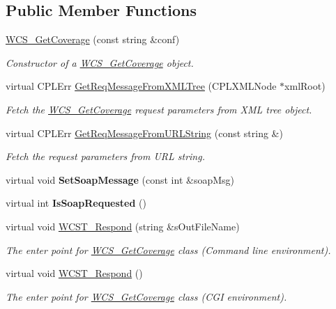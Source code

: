 \subsection*{Public Member Functions}
\begin{DoxyCompactItemize}
\item 
\hyperlink{classWCS__GetCoverage_a2bc572e0a90baf87f5d572d29db7e32e}{WCS\_\-GetCoverage} (const string \&conf)
\begin{DoxyCompactList}\small\item\em Constructor of a \hyperlink{classWCS__GetCoverage}{WCS\_\-GetCoverage} object. \end{DoxyCompactList}\item 
virtual CPLErr \hyperlink{classWCS__GetCoverage_a1a23003ebbaef4915fdc88863abf987c}{GetReqMessageFromXMLTree} (CPLXMLNode $\ast$xmlRoot)
\begin{DoxyCompactList}\small\item\em Fetch the \hyperlink{classWCS__GetCoverage}{WCS\_\-GetCoverage} request parameters from XML tree object. \end{DoxyCompactList}\item 
virtual CPLErr \hyperlink{classWCS__GetCoverage_aff25c578374abc386dc1455990198276}{GetReqMessageFromURLString} (const string \&)
\begin{DoxyCompactList}\small\item\em Fetch the request parameters from URL string. \end{DoxyCompactList}\item 
\hypertarget{classWCS__GetCoverage_aa5828099182998b05b50418161d01c8d}{
virtual void {\bfseries SetSoapMessage} (const int \&soapMsg)}
\label{classWCS__GetCoverage_aa5828099182998b05b50418161d01c8d}

\item 
\hypertarget{classWCS__GetCoverage_a2091115ee1479ddef8071f8fca80cf6b}{
virtual int {\bfseries IsSoapRequested} ()}
\label{classWCS__GetCoverage_a2091115ee1479ddef8071f8fca80cf6b}

\item 
virtual void \hyperlink{classWCS__GetCoverage_ad6d663aa5cd34f1cfeec96a8aa67fe6d}{WCST\_\-Respond} (string \&sOutFileName)
\begin{DoxyCompactList}\small\item\em The enter point for \hyperlink{classWCS__GetCoverage}{WCS\_\-GetCoverage} class (Command line environment). \end{DoxyCompactList}\item 
virtual void \hyperlink{classWCS__GetCoverage_ad8123a3ce047ab51e943bec28c6bca02}{WCST\_\-Respond} ()
\begin{DoxyCompactList}\small\item\em The enter point for \hyperlink{classWCS__GetCoverage}{WCS\_\-GetCoverage} class (CGI environment). \end{DoxyCompactList}\end{DoxyCompactItemize}
